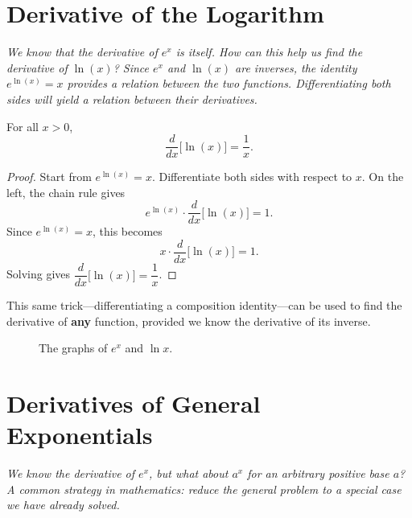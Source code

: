 \section{Derivative of the Logarithm}
\label{sec:4.7}

\textit{We know that the derivative of $e^{x}$ is itself.  How can this help us find the derivative of $\ln(x)$?  Since $e^{x}$ and $\ln(x)$ are inverses, the identity $e^{\ln(x)} = x$ provides a relation between the two functions.  Differentiating both sides will yield a relation between their derivatives.}

\begin{theorem}[Derivative of $\ln$]
\label{thm:4-5}
For all $x > 0$,
\[
  \frac{d}{dx}\bigl[\ln(x)\bigr] = \frac{1}{x}.
\]
\end{theorem}

\begin{proof}
Start from $e^{\ln(x)} = x$.  Differentiate both sides with respect to $x$.  On the left, the chain rule gives
\[
  e^{\ln(x)} \cdot \frac{d}{dx}\bigl[\ln(x)\bigr] = 1.
\]
Since $e^{\ln(x)} = x$, this becomes
\[
  x \cdot \frac{d}{dx}\bigl[\ln(x)\bigr] = 1.
\]
Solving gives $\dfrac{d}{dx}\bigl[\ln(x)\bigr] = \dfrac{1}{x}$.
\end{proof}

\begin{remark}
This same trick---differentiating a composition identity---can be used to find the derivative of \textbf{any} function, provided we know the derivative of its inverse.
\end{remark}

\begin{figure}[ht]
  \centering
  
  \caption{The graphs of $e^x$ and $\ln x$.}
  \label{fig:exp-log}
\end{figure}

\section{Derivatives of General Exponentials}
\label{sec:4.8}

\textit{We know the derivative of $e^{x}$, but what about $a^{x}$ for an arbitrary positive base $a$?  A common strategy in mathematics: reduce the general problem to a special case we have already solved.}

